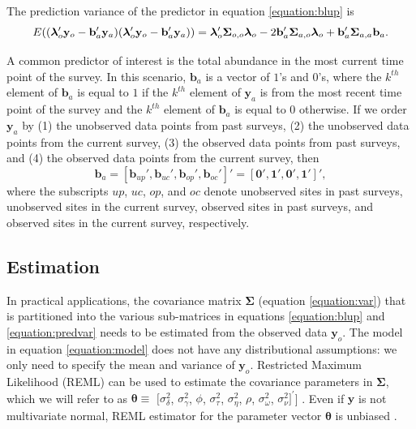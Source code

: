 \documentclass[]{interact}
\theoremstyle{plain}%
\theoremstyle{definition}
\theoremstyle{remark}
\begin{document}
The prediction variance of the predictor in equation \ref{equation:blup}
is \mbox{} \begin{equation} \label{equation:predvar}
E((\bm{\lambda}_o'\mathbf{y}_o - \mathbf{b}_a'\mathbf{y}_a)(\bm{\lambda}_o'\mathbf{y}_o - \mathbf{b}_a'\mathbf{y}_a)) = \\
\bm{\lambda}_o'\bm{\Sigma}_{o, o}\bm{\lambda}_o - 2 \mathbf{b}_a' \bm{\Sigma}_{a, o} \bm{\lambda}_o + \mathbf{b}_a' \bm{\Sigma}_{a, a} \mathbf{b}_a.
\end{equation}

A common predictor of interest is the total abundance in the most
current time point of the survey. In this scenario, \(\mathbf{b}_a\) is
a vector of \(1\)'s and \(0\)'s, where the \(k^{th}\) element of
\(\mathbf{b}_a\) is equal to \(1\) if the \(k^{th}\) element of
\(\mathbf{y}_a\) is from the most recent time point of the survey and
the \(k^{th}\) element of \(\mathbf{b}_a\) is equal to 0 otherwise. If
we order \(\mathbf{y}_a\) by (1) the unobserved data points from past
surveys, (2) the unobserved data points from the current survey, (3) the
observed data points from past surveys, and (4) the observed data points
from the current survey, then \mbox{} \begin{equation}
\mathbf{b}_a = [\mathbf{b}_{up}', \mathbf{b}_{uc}', \mathbf{b}_{op}', \mathbf{b}_{oc}']' = [\mathbf{0}', \mathbf{1}', \mathbf{0}', \mathbf{1}']',
\end{equation} \noindent where the subscripts \(up\), \(uc\), \(op\),
and \(oc\) denote unobserved sites in past surveys, unobserved sites in
the current survey, observed sites in past surveys, and observed sites
in the current survey, respectively.

\subsection{Estimation}

In practical applications, the covariance matrix \(\bm{\Sigma}\)
(equation \ref{equation:var}) that is partitioned into the various
sub-matrices in equations \ref{equation:blup} and \ref{equation:predvar}
needs to be estimated from the observed data \(\mathbf{y}_o\). The model
in equation \ref{equation:model} does not have any distributional
assumptions: we only need to specify the mean and variance of
\(\mathbf{y}_o\). Restricted Maximum Likelihood (REML) can be used to
estimate the covariance parameters in \(\bm{\Sigma}\), which we will
refer to as \(\bm{\theta} \equiv\) \([\sigma^2_{\delta}\),
\(\sigma^2_{\gamma}\), \(\phi\), \(\sigma^2_{\tau}\),
\(\sigma^2_{\eta}\), \(\rho\), \(\sigma^2_{\omega}\),
\(\sigma^2_{\nu}]^\prime\){]}
\citep{patterson1971recovery, harville1977maximum}. Even if
\(\mathbf{y}\) is not multivariate normal, REML estimator for the
parameter vector \(\bm{\theta}\) is unbiased
\citep{heyde1994quasi, cressie1993asymptotic}.
\end{document}
